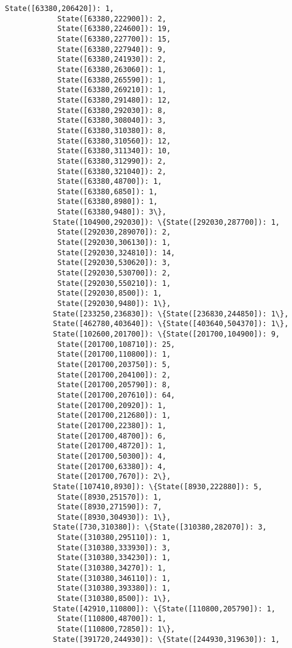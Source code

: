 \documentclass[11pt]{article}
\begin{document}
\begin{Verbatim}[commandchars=\\\{\}]
            State([63380,206420]): 1,
            State([63380,222900]): 2,
            State([63380,224600]): 19,
            State([63380,227700]): 15,
            State([63380,227940]): 9,
            State([63380,241930]): 2,
            State([63380,263060]): 1,
            State([63380,265590]): 1,
            State([63380,269210]): 1,
            State([63380,291480]): 12,
            State([63380,292030]): 8,
            State([63380,308040]): 3,
            State([63380,310380]): 8,
            State([63380,310560]): 12,
            State([63380,311340]): 10,
            State([63380,312990]): 2,
            State([63380,321040]): 2,
            State([63380,48700]): 1,
            State([63380,6850]): 1,
            State([63380,8980]): 1,
            State([63380,9480]): 3\},
           State([104900,292030]): \{State([292030,287700]): 1,
            State([292030,289070]): 2,
            State([292030,306130]): 1,
            State([292030,324810]): 14,
            State([292030,530620]): 3,
            State([292030,530700]): 2,
            State([292030,550210]): 1,
            State([292030,8500]): 1,
            State([292030,9480]): 1\},
           State([233250,236830]): \{State([236830,244850]): 1\},
           State([462780,403640]): \{State([403640,504370]): 1\},
           State([102600,201700]): \{State([201700,104900]): 9,
            State([201700,108710]): 25,
            State([201700,110800]): 1,
            State([201700,203750]): 5,
            State([201700,204100]): 2,
            State([201700,205790]): 8,
            State([201700,207610]): 64,
            State([201700,20920]): 1,
            State([201700,212680]): 1,
            State([201700,22380]): 1,
            State([201700,48700]): 6,
            State([201700,48720]): 1,
            State([201700,50300]): 4,
            State([201700,63380]): 4,
            State([201700,7670]): 2\},
           State([107410,8930]): \{State([8930,222880]): 5,
            State([8930,251570]): 1,
            State([8930,271590]): 7,
            State([8930,304930]): 1\},
           State([730,310380]): \{State([310380,282070]): 3,
            State([310380,295110]): 1,
            State([310380,333930]): 3,
            State([310380,334230]): 1,
            State([310380,34270]): 1,
            State([310380,346110]): 1,
            State([310380,393380]): 1,
            State([310380,8500]): 1\},
           State([42910,110800]): \{State([110800,205790]): 1,
            State([110800,48700]): 1,
            State([110800,72850]): 1\},
           State([391720,244930]): \{State([244930,319630]): 1,

\end{Verbatim}
\end{document}
